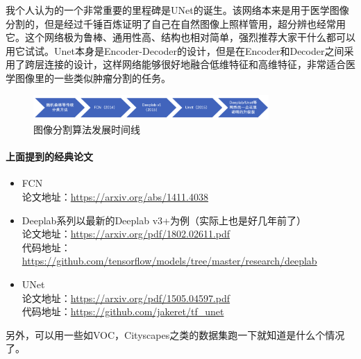 \documentclass[lang=cn,11pt,a4paper]{eleganttemplate}
\begin{document}
我个人认为的一个非常重要的里程碑是UNet的诞生。该网络本来是用于医学图像分割的，但是经过千锤百炼证明了自己在自然图像上照样管用，超分辨也经常用它。这个网络极为鲁棒、通用性高、结构也相对简单，强烈推荐大家干什么都可以用它试试。Unet本身是Encoder-Decoder的设计，但是在Encoder和Decoder之间采用了跨层连接的设计，这样网络能够很好地融合低维特征和高维特征，非常适合医学图像里的一些类似肿瘤分割的任务。

\begin{figure}[htbp]
  \centering
  \includegraphics[width=0.8\textwidth]{image/cv_8.png}
  \caption{图像分割算法发展时间线}
\end{figure}

\paragraph{上面提到的经典论文}
\begin{itemize}
    \item FCN \\
    论文地址：\href{https://arxiv.org/abs/1411.4038}{https://arxiv.org/abs/1411.4038} 
    \item Deeplab系列以最新的Deeplab v3+为例（实际上也是好几年前了）\\
    论文地址：\href{https://arxiv.org/pdf/1802.02611.pdf}{https://arxiv.org/pdf/1802.02611.pdf} \\
    代码地址：\href{https://github.com/tensorflow/models/tree/master/research/deeplab}{https://github.com/tensorflow/models/tree/master/research/deeplab} 
    \item UNet \\
    论文地址：\href{https://arxiv.org/pdf/1505.04597.pdf}{https://arxiv.org/pdf/1505.04597.pdf} \\
    代码地址：\href{https://github.com/jakeret/tf_unet}{https://github.com/jakeret/tf\_unet} 
\end{itemize}
另外，可以用一些如VOC，Cityscapes之类的数据集跑一下就知道是什么个情况了。
\end{document}
